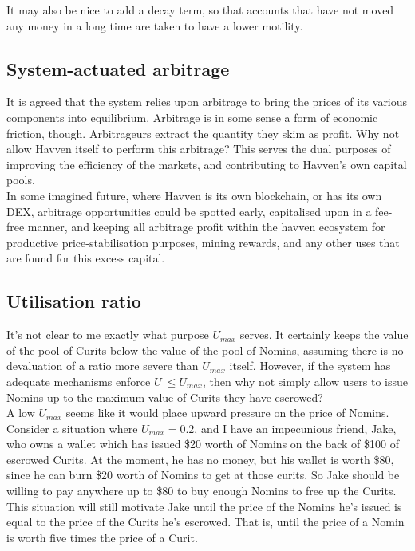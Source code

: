 \noindent It may also be nice to add a decay term, so that accounts that have not moved any money in a long time are taken to have a lower motility.

\subsection{System-actuated arbitrage}

It is agreed that the system relies upon arbitrage to bring the prices of its various components into equilibrium. Arbitrage is in some sense a form of economic friction, though. Arbitrageurs extract the quantity they skim as profit. Why not allow Havven itself to perform this arbitrage? This serves the dual purposes of improving the efficiency of the markets, and contributing to Havven's own capital pools.\\

\noindent In some imagined future, where Havven is its own blockchain, or has its own DEX, arbitrage opportunities could be spotted early, capitalised upon in a fee-free manner, and keeping all arbitrage profit within the havven ecosystem for productive price-stabilisation purposes, mining rewards, and any other uses that are found for this excess capital.

\pagebreak
\subsection{Utilisation ratio}

It's not clear to me exactly what purpose \(U_{max}\) serves. It certainly keeps the value of the pool of Curits below the value of the pool of Nomins, assuming there is no devaluation of a ratio more severe than \(U_{max}\) itself. However, if the system has adequate mechanisms enforce \(U\ \leq U_{max}\), then why not simply allow users to issue Nomins up to the maximum value of Curits they have escrowed? \\

\noindent A low \(U_{max}\) seems like it would place upward pressure on the price of Nomins. Consider a situation where \(U_{max} = 0.2\), and I have an impecunious friend, Jake, who owns a wallet which has issued \$20 worth of Nomins on the back of \$100 of escrowed Curits. At the moment, he has no
money, but his wallet is worth \$80, since he can burn \$20 worth of Nomins to get at those curits. So Jake should be willing to pay anywhere up to \$80 to buy enough Nomins to free up the Curits. This situation will still motivate Jake until the price of the Nomins he's issued is equal to the price of the Curits he's escrowed. That is, until the price of a Nomin is worth five times the price of a Curit.\\

